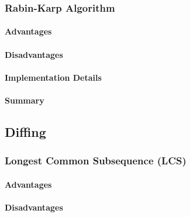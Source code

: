 \subsubsection{Rabin-Karp Algorithm}

\paragraph{Advantages}
\paragraph{Disadvantages}

\paragraph{Implementation Details}

\paragraph{Summary}



\subsection{Diffing}


\subsubsection{Longest Common Subsequence (LCS)}

\paragraph{Advantages}
\paragraph{Disadvantages}

